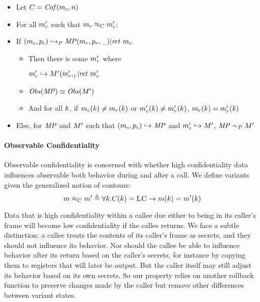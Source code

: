\documentclass[conference]{IEEEtran}
\begin{document}
      \begin{itemize}
        \item Let \(C = \mathit{Cof}(m_c,n)\)
        \item For all \(m_c'\) such that \(m_c \approx_C m_c'\):
        \item If \((m_c,p_c) \hookrightarrow_P \mathit{MP} (m_r,p_r,\_) | \mathit{ret}\ m_c\)
          \begin{itemize}
            \item Then there is some \(m_r'\) where
              
              \(m_c' \hookrightarrow M' (m_r',_) | \mathit{ret}\ m_c'\)
            \item \(\mathit{Obs}(\mathit{MP}) \simeq \mathit{Obs}(M')\)
            \item And for all \(k\), if \(m_c(k) \not = m_r(k)\) or
              \(m_c'(k) \not = m_r'(k)\), \(m_r(k) = m_r'(k)\)
          \end{itemize}
        \item Else, for \(\mathit{MP}\) and \(M'\) such that \((m_c,p_c) \hookrightarrow \mathit{MP}\)
          and \(m_c' \hookrightarrow M'\), \(\mathit{MP} \sim_P M'\)
      \end{itemize}

      
    \paragraph{Observable Confidentiality}

      Observable confidentiality is concerned with whether high confidentiality data influences
      observable both behavior during and after a call. We define variants given the generalized notion
      of contours:
      \[m \approx_C m' \triangleq \forall k .
      C(k) = \textsc{LC} \rightarrow m(k) = m'(k)\]

      Data that is high confidentiality within a callee due either to being in its caller's frame
      will become low confidentiality if the callee returns. We face a subtle distinction: 
      a callee treats the contents of its caller's frame as secrets, and they should not influence
      its behavior. Nor should the callee be able to influence behavior after its return based
      on the caller's secrets, for instance by copying them to registers that will later be output.
      But the caller itself may still adjust its behavior based on its own secrets. So our property
      relies on another rollback function to preserve changes made by the caller but remove other
      differences between variant states.
\end{document}

